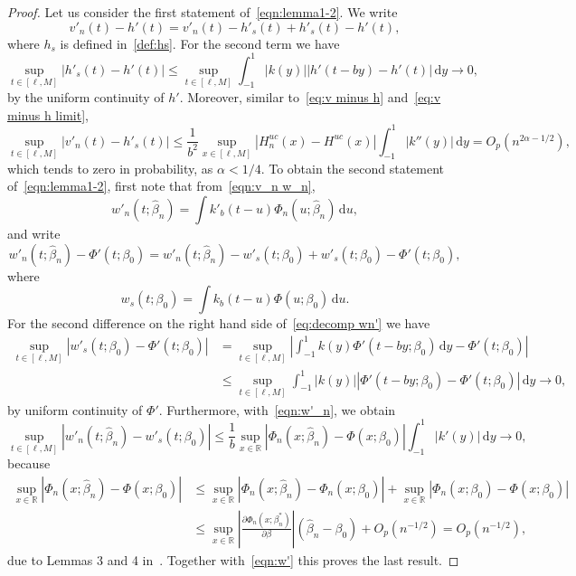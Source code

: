 \documentclass[11pt,reqno]{amsart}
\theoremstyle{definition}
\theoremstyle{plain}
\theoremstyle{remark}
\begin{document}
\begin{proof}
Let us consider the first statement  of~\eqref{eqn:lemma1-2}.
We write
\[
v'_n(t)-h'(t)
=
v'_n(t)-h'_s(t)+h'_s(t)-h'(t),
\]
where $h_s$ is defined in~\eqref{def:hs}.
For the second term we have
\[
\sup_{t\in[\ell,M]}
\left|h'_s(t)-h'(t)\right|
\leq
\sup_{t\in[\ell,M]}
\int_{-1}^1
|k(y)|\left|h'(t-by)-h'(t)\right|\,\mathrm{d}y\to0,
\]
by the uniform continuity of $h'$.
Moreover, similar to~\eqref{eq:v minus h} and~\eqref{eq:v minus h limit},
\[
\sup_{t\in[\ell,M]}
\left|v'_n(t)-h'_s(t)\right|
\leq
\frac{1}{b^2}
\sup_{x\in[\ell,M]}|H^{uc}_n(x)-H^{uc}(x)|
\int_{-1}^1 |k''(y)|\,\mathrm{d}y
=
O_p(n^{2\alpha-1/2}),
\]
which tends to zero in probability, as $\alpha<1/4$.
To obtain the second statement of~\eqref{eqn:lemma1-2}, first note that from~\eqref{eqn:v_n w_n},
\begin{equation}
\label{eqn:w'_n}
w'_n(t;\hat{\beta}_n)
=
\int k'_b(t-u)\Phi_n(u;\hat{\beta}_n)\,\mathrm{d}u,
\end{equation}
and write
\begin{equation}
\label{eq:decomp wn'}
w'_n(t;\hat{\beta}_n)-\Phi'(t;\beta_0)
=
w'_n(t;\hat{\beta}_n)-w'_s(t;\beta_0)
+
w'_s(t;\beta_0)-\Phi'(t;\beta_0),
\end{equation}
where
\[
w_s(t;\beta_0)=\int k_b(t-u)\Phi(u;\beta_0)\,\mathrm{d}u.
\]
For the second difference on the right hand side of~\eqref{eq:decomp wn'} we have
\begin{equation}
\label{eqn:w'}
\begin{split}
\sup_{t\in[\ell,M]}
\left|w'_s(t;\beta_0)-\Phi'(t;\beta_0)\right|
&=
\sup_{t\in[\ell,M]}
\left|\int_{-1}^1 k(y)\Phi'(t-by;\beta_0)\,\mathrm{d}y-\Phi'(t;\beta_0)\right|\\
&\leq
\sup_{t\in[\ell,M]}
\int_{-1}^1 |k(y)|
\left|
\Phi'(t-by;\beta_0)-\Phi'(t;\beta_0)
\right| \,\mathrm{d}y\to 0,
\end{split}
\end{equation}
by uniform continuity of $\Phi'$.
Furthermore, with~\eqref{eqn:w'_n}, we obtain
\[
\sup_{t\in[\ell,M]}
\left|w'_n(t;\hat{\beta}_n)-w'_s(t;\beta_0)\right|
\leq
\frac{1}{b}\sup_{x\in{\mathbb{R}}}|\Phi_n(x;\hat{\beta}_n)-\Phi(x;\beta_0)|
\int_{-1}^1|k'(y)|\,\mathrm{d}y\to 0,
\]
because
\begin{equation}
\label{eq:Phihat-Phi0}
\begin{split}
\sup_{x\in{\mathbb{R}}}|\Phi_n(x;\hat{\beta}_n)-\Phi(x;\beta_0)|
&\leq
\sup_{x\in{\mathbb{R}}}|\Phi_n(x;\hat{\beta}_n)-\Phi_n(x;\beta_0)|
+
\sup_{x\in{\mathbb{R}}}|\Phi_n(x;\beta_0)-\Phi(x;\beta_0)|\\
&\leq
\sup_{x\in{\mathbb{R}}}
\left|
\frac{\partial\Phi_n(x;\beta_n^*)}{\partial\beta}
\right|(\hat\beta_n-\beta_0)
+
O_p(n^{-1/2})
=
O_p(n^{-1/2}),
\end{split}
\end{equation}
due to Lemmas 3 and 4 in~\cite{LopuhaaNane2013}.
Together with~\eqref{eqn:w'} this proves the last result.
\end{proof}
\end{document}
